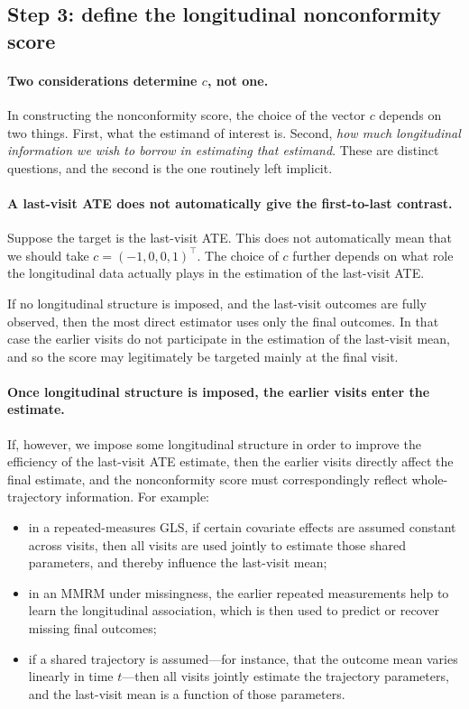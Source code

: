 \documentclass[11pt]{article}
\begin{document}
\subsection{Step 3: define the longitudinal nonconformity score}

\paragraph{Two considerations determine $c$, not one.}
In constructing the nonconformity score, the choice of the vector $c$ depends on two things. First, what the estimand of interest is. Second, \emph{how much longitudinal information we wish to borrow in estimating that estimand}. These are distinct questions, and the second is the one routinely left implicit.

\paragraph{A last-visit ATE does not automatically give the first-to-last contrast.}
Suppose the target is the last-visit ATE. This does not automatically mean that we should take $c=(-1,0,0,1)^{\top}$. The choice of $c$ further depends on what role the longitudinal data actually plays in the estimation of the last-visit ATE.

If no longitudinal structure is imposed, and the last-visit outcomes are fully observed, then the most direct estimator uses only the final outcomes. In that case the earlier visits do not participate in the estimation of the last-visit mean, and so the score may legitimately be targeted mainly at the final visit.

\paragraph{Once longitudinal structure is imposed, the earlier visits enter the estimate.}
If, however, we impose some longitudinal structure in order to improve the efficiency of the last-visit ATE estimate, then the earlier visits directly affect the final estimate, and the nonconformity score must correspondingly reflect whole-trajectory information. For example:
\begin{itemize}[leftmargin=*,itemsep=2pt,topsep=3pt]
\item in a repeated-measures GLS, if certain covariate effects are assumed constant across visits, then all visits are used jointly to estimate those shared parameters, and thereby influence the last-visit mean;
\item in an MMRM under missingness, the earlier repeated measurements help to learn the longitudinal association, which is then used to predict or recover missing final outcomes;
\item if a shared trajectory is assumed---for instance, that the outcome mean varies linearly in time $t$---then all visits jointly estimate the trajectory parameters, and the last-visit mean is a function of those parameters.
\end{itemize}
\end{document}
